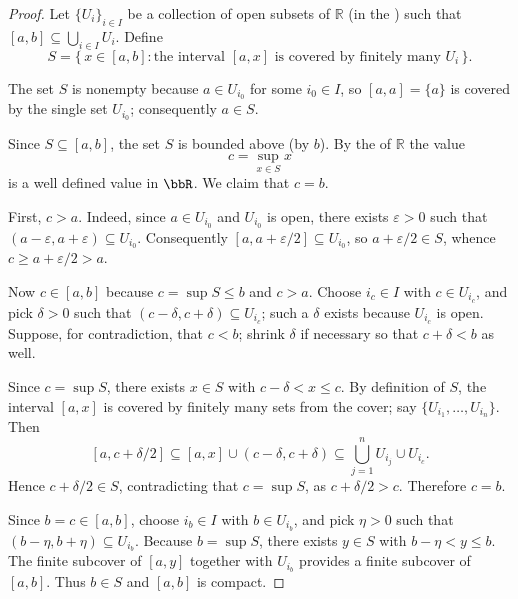 \begin{proof}
    Let $\{U_i\}_{i \in I}$ be a collection of open subsets of $\mathbb{R}$ (in the ) such that $[a,b] \subseteq \bigcup_{i \in I} U_i$. Define
    $$S = \{\, x \in [a,b] : \text{the interval } [a,x] \text{ is covered by finitely many } U_i \,\}.$$

    The set $S$ is nonempty because $a \in U_{i_0}$ for some $i_0 \in I$, so $[a,a] = \{a\}$ is covered by the single set $U_{i_0}$; consequently $a \in S$.

    Since $S \subseteq [a,b]$, the set $S$ is bounded above (by $b$). By the  of $\mathbb{R}$ the value
    $$c = \sup_{x \in S} x$$
    is a well defined value in $\bbR$. We claim that $c = b$.

    First, $c > a$. Indeed, since $a \in U_{i_0}$ and $U_{i_0}$ is open, there exists $\varepsilon > 0$ such that $(a - \varepsilon, a + \varepsilon) \subseteq U_{i_0}$. Consequently $[a, a + \varepsilon/2] \subseteq U_{i_0}$, so $a + \varepsilon/2 \in S$, whence $c \ge a + \varepsilon/2 > a$.

    Now $c \in [a,b]$ because $c = \sup S \le b$ and $c > a$. Choose $i_c \in I$ with $c \in U_{i_c}$, and pick $\delta > 0$ such that $(c - \delta, c + \delta) \subseteq U_{i_c}$; such a $\delta$ exists because $U_{i_c}$ is open. Suppose, for contradiction, that $c < b$; shrink $\delta$ if necessary so that $c + \delta < b$ as well.

    Since $c = \sup S$, there exists $x \in S$ with $c - \delta < x \le c$. By definition of $S$, the interval $[a,x]$ is covered by finitely many sets from the cover; say $\{U_{i_1}, \dots, U_{i_n}\}$. Then
    $$[a, c + \delta/2] \subseteq [a,x] \cup (c - \delta, c + \delta) \subseteq \bigcup_{j=1}^n U_{i_j} \cup U_{i_c}.$$
    Hence $c + \delta/2 \in S$, contradicting that $c = \sup S$, as $c + \delta/2 > c$. Therefore $c = b$.

    Since $b = c \in [a,b]$, choose $i_b \in I$ with $b \in U_{i_b}$, and pick $\eta > 0$ such that $(b - \eta, b + \eta) \subseteq U_{i_b}$. Because $b = \sup S$, there exists $y \in S$ with $b - \eta < y \le b$. The finite subcover of $[a,y]$ together with $U_{i_b}$ provides a finite subcover of $[a,b]$. Thus $b \in S$ and $[a,b]$ is compact.
\end{proof}